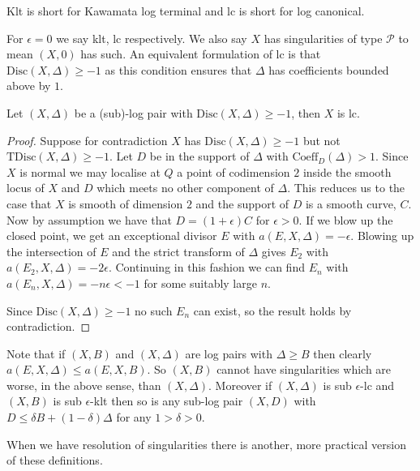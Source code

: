 \begin{remark}
	
	Klt is short for Kawamata log terminal and lc is short for log canonical.
	\end{remark}

For $\epsilon=0$ we say klt, lc respectively. We also say $X$ has singularities of type $\mathcal{P}$ to mean $(X,0)$ has such. An equivalent formulation of lc is that $\text{Disc}(X,\Delta) \geq -1$ as this condition ensures that $\Delta$ has coefficients bounded above by $1$.

\begin{lemma}
	
	Let $(X,\Delta)$ be a (sub)-log pair with $\text{Disc}(X,\Delta) \geq -1$, then $X$ is lc.
	
	\end{lemma}

\begin{proof}
	Suppose for contradiction $X$ has $\text{Disc}(X,\Delta) \geq -1$ but not $\text{TDisc}(X,\Delta) \geq -1$. Let $D$ be in the support of $\Delta$ with $\text{Coeff}_{D}(\Delta) > 1$. Since $X$ is normal we may localise at $Q$ a point of codimension $2$ inside the smooth locus of $X$ and $D$ which meets no other component of $\Delta$. This reduces us to the case that $X$ is smooth of dimension $2$ and the support of $D$ is a smooth curve, $C$. Now by assumption we have that $D=(1+\epsilon)C$ for $\epsilon > 0$. If we blow up the closed point, we get an exceptional divisor $E$ with $a(E,X,\Delta)=-\epsilon$. Blowing up the intersection of $E$ and the strict transform of $\Delta$ gives $E_{2}$ with $a(E_{2},X,\Delta)=-2\epsilon$. Continuing in this fashion we can find $E_{n}$ with $a(E_{n},X,\Delta)=-n\epsilon< -1$ for some suitably large $n$.

Since $\text{Disc}(X,\Delta) \geq -1$ no such $E_{n}$ can exist, so the result holds by contradiction.
\end{proof}

Note that if $(X,B)$ and $(X,\Delta)$ are log pairs with $\Delta \geq B$ then clearly $a(E,X,\Delta) \leq a(E,X,B)$. So $(X,B)$ cannot have singularities which are worse, in the above sense, than $(X,\Delta)$. Moreover if $(X,\Delta)$ is sub $\epsilon$-lc and $(X,B)$ is sub $\epsilon$-klt then so is any sub-log pair $(X,D)$ with $D \leq \delta B+(1-\delta)\Delta$ for any $1>\delta >0$.

When we have resolution of singularities there is another, more practical version of these definitions.

